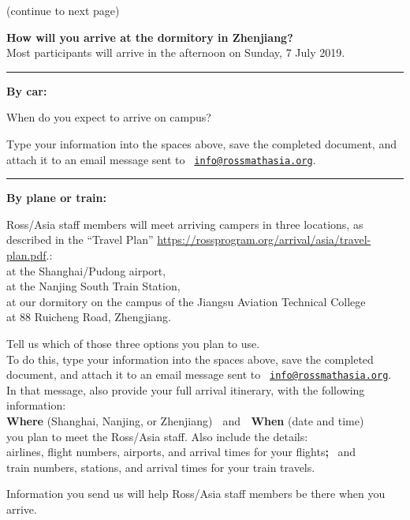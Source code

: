 \documentclass{rossasia}
\newcommand{\spz}{\hspace*{5mm}}
\newcommand{\spa}{\hspace*{10mm}}
\begin{document}
\vfill
{\scriptsize (continue to next page)}

\pagebreak

{\bf How will you arrive at the dormitory in Zhenjiang?}\\
Most participants will arrive in the afternoon on Sunday, 7 July 2019.  \\

\bigskip\hrule
{\bf By car:} 

When do you expect to arrive on campus?  \\[5pt]
\spa\spa {}  \hspace*{2cm}   


Type your information into the spaces above, save the completed document, and attach it to an email message sent to 
\texttt{ \href{mailto:info@rossmathasia.org}{info@rossmathasia.org}}. \\[3pt]

\bigskip\hrule
{\bf By plane or train:} 

Ross/Asia staff members will meet arriving campers in three locations, as described in the ``Travel Plan''  \url{https://rossprogram.org/arrival/asia/travel-plan.pdf}.:\\
\spa at the Shanghai/Pudong airport, \\
\spa at the Nanjing South Train Station, \\
\spa at our dormitory on the campus of the Jiangsu Aviation Technical College \\
\hspace*{15mm}at 88 Ruicheng Road, Zhengjiang.

Tell us which of those three options you plan to use.  \\
To do this, type your information into the spaces above, save the completed document, and attach it to an email message sent to 
\texttt{ \href{mailto:info@rossmathasia.org}{info@rossmathasia.org}}. \\[3pt]
In that message, also provide your full arrival itinerary, with the following information:  \\
\spz  \textbf{Where} (Shanghai, Nanjing, or Zhenjiang) $\;$ and $\;$   \textbf{When} (date and time) \\
you plan to meet the Ross/Asia staff.  Also include the details: \\
\spa  airlines, flight numbers, airports, and arrival times for your flights{\bf ;} \ and\\
\spa  train numbers, stations, and arrival times for your train travels.

\bigskip\bigskip

Information you send us will help Ross/Asia staff members be there when you arrive.
\end{document}
